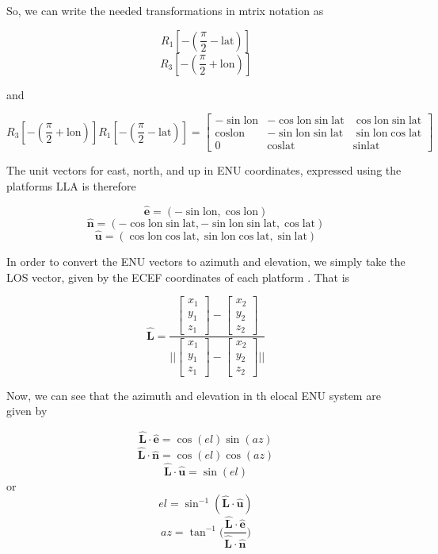 \documentclass{article}
\begin{document}
So, we can write the needed transformations in mtrix notation as

$$R_1[-(\frac{\pi}{2}-\text{lat})]$$
$$R_3[-(\frac{\pi}{2}+\text{lon})]$$

and 

$$R_3[-(\frac{\pi}{2}+\text{lon})]R_1[-(\frac{\pi}{2}-\text{lat})] = \begin{bmatrix}
  -\sin\text{lon}&-\cos\text{lon}\sin\text{lat}&\cos\text{lon}\sin\text{lat}\\
  \cos\text{lon}&-\sin\text{lon}\sin\text{lat}&\sin\text{lon}\cos\text{lat}\\
  0&\cos\text{lat}&\sin\text{lat}
\end{bmatrix}$$

The unit vectors for east, north, and up in ENU coordinates, expressed using the platforms LLA is therefore

$$\hat{\textbf{e}} = (-\sin\text{lon}, \cos\text{lon})$$
$$\hat{\textbf{n}} = (-\cos\text{lon}\sin\text{lat}, -\sin\text{lon}\sin\text{lat}, \cos\text{lat})$$
$$\hat{\textbf{u}} = (\cos\text{lon}\cos\text{lat}, \sin\text{lon}\cos\text{lat}, \sin\text{lat})$$

In order to convert the ENU vectors to azimuth and elevation, we simply take the LOS vector, given by the ECEF 
coordinates of each platform \cite{wertz_space_2005} \cite{ecef2enu} \cite{transBtwTerFrames}. That is

$$\hat{\textbf{L}} = \frac{\begin{bmatrix}x_1\\y_1\\z_1\end{bmatrix}-\begin{bmatrix}x_2\\y_2\\z_2\end{bmatrix}}{||\begin{bmatrix}x_1\\y_1\\z_1\end{bmatrix}-\begin{bmatrix}x_2\\y_2\\z_2\end{bmatrix}||}$$

Now, we can see that the azimuth and elevation in th elocal ENU system are given by

$$\hat{\textbf{L}}\cdot\hat{\textbf{e}} = \cos(el)\sin(az)$$
$$\hat{\textbf{L}}\cdot\hat{\textbf{n}} = \cos(el)\cos(az)$$
$$\hat{\textbf{L}}\cdot\hat{\textbf{u}} = \sin(el)$$
or
$$el = \sin^{-1}(\hat{\textbf{L}} \cdot \hat{\textbf{u}})$$
$$az = \tan^{-1}\biggl(\frac{\hat{\textbf{L}}\cdot\hat{\textbf{e}}}{\hat{\textbf{L}}\cdot\hat{\textbf{n}}}\biggr)$$



\end{document}
